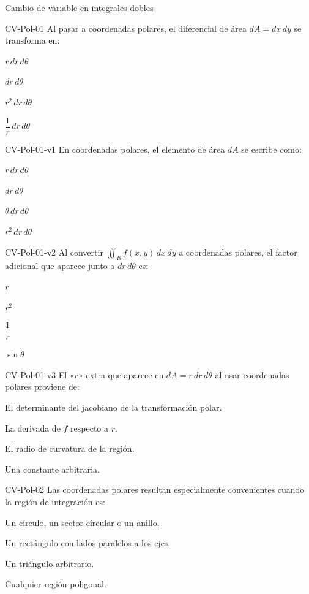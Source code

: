 \documentclass[a4,11pt]{aleph-notas}
\begin{document}
\begin{quiz}{Cambio de variable en integrales dobles}
\begin{multi}[]%
    {CV-Pol-01}
    Al pasar a coordenadas polares, el diferencial de área $dA = dx\,dy$ se transforma en:
    \item* $r\,dr\,d\theta$
    \item $dr\,d\theta$
    \item $r^2\,dr\,d\theta$
    \item $\dfrac{1}{r}\,dr\,d\theta$
\end{multi}

\begin{multi}[]%
    {CV-Pol-01-v1}
    En coordenadas polares, el elemento de área $dA$ se escribe como:
    \item* $r\,dr\,d\theta$
    \item $dr\,d\theta$
    \item $\theta\,dr\,d\theta$
    \item $r^2\,dr\,d\theta$
\end{multi}

\begin{multi}[]%
    {CV-Pol-01-v2}
    Al convertir $\displaystyle\iint_R f(x,y)\,dx\,dy$ a coordenadas polares, el factor adicional que aparece junto a $dr\,d\theta$ es:
    \item* $r$
    \item $r^2$
    \item $\dfrac{1}{r}$
    \item $\sin\theta$
\end{multi}

\begin{multi}[]%
    {CV-Pol-01-v3}
    El «$r$» extra que aparece en $dA = r\,dr\,d\theta$ al usar coordenadas polares proviene de:
    \item* El determinante del jacobiano de la transformación polar.
    \item La derivada de $f$ respecto a $r$.
    \item El radio de curvatura de la región.
    \item Una constante arbitraria.
\end{multi}

\begin{multi}[]%
    {CV-Pol-02}
    Las coordenadas polares resultan especialmente convenientes cuando la región de integración es:
    \item* Un círculo, un sector circular o un anillo.
    \item Un rectángulo con lados paralelos a los ejes.
    \item Un triángulo arbitrario.
    \item Cualquier región poligonal.
\end{multi}


\end{quiz}
\end{document}
